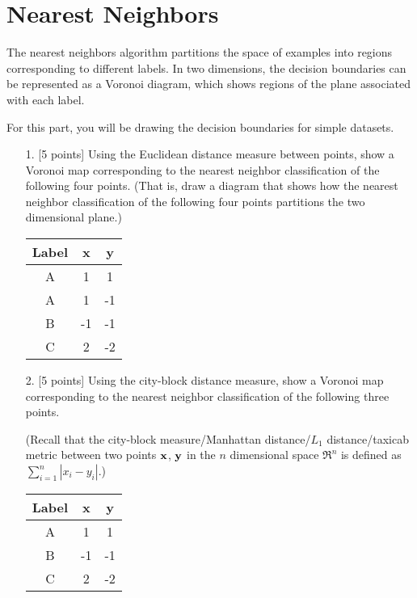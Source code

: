 \section{Nearest Neighbors}

The nearest neighbors algorithm partitions the space of examples into
regions corresponding to different labels. In two dimensions, the
decision boundaries can be represented as a Voronoi diagram, which
shows regions of the plane associated with each label. 

For this part, you will be drawing the decision boundaries for simple
datasets. 

\begin{enumerate}
\item[1.] [5 points] Using the Euclidean distance measure between
  points, show a Voronoi map corresponding to the nearest neighbor
  classification of the following four points. (That is, draw a
  diagram that shows how the nearest neighbor classification of the
  following four points partitions the two dimensional plane.)

  \begin{center}
    \begin{tabular}{|c|cc|}
      \hline
      Label & x  & y  \\
      \hline
      A     & 1  & 1  \\
      A     & 1  & -1 \\
      B     & -1 & -1 \\
      C     & 2  & -2 \\
      \hline
    \end{tabular}
  \end{center}

\item[2.] [5 points] Using the city-block distance measure, show a
  Voronoi map corresponding to the nearest neighbor classification of
  the following three points.
  
  (Recall that the city-block measure/Manhattan distance/$L_1$
  distance/taxicab metric between two points ${\bf x}$, ${\bf y}$ in
  the $n$ dimensional space $\Re^n$ is defined as $\sum_{i=1}^n |x_i -
  y_i|$.) 

  \begin{center}
    \begin{tabular}{|c|cc|}
      \hline
      Label & x  & y  \\
      \hline
      A     & 1  & 1  \\
      B     & -1 & -1 \\
      C     & 2  & -2 \\
      \hline
    \end{tabular}
  \end{center}



\end{enumerate}
